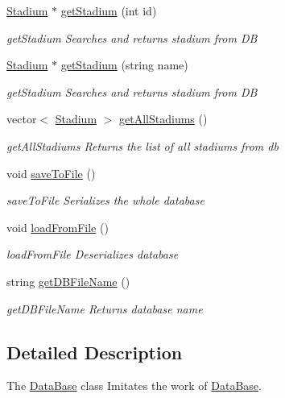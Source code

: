 \begin{DoxyCompactItemize}
\hyperlink{class_stadium}{Stadium} $\ast$ \hyperlink{class_data_base_ac74f70e78835fe65bc511996cdec1271}{get\-Stadium} (int id)
\begin{DoxyCompactList}\small\item\em get\-Stadium Searches and returns stadium from D\-B \end{DoxyCompactList}\item 
\hyperlink{class_stadium}{Stadium} $\ast$ \hyperlink{class_data_base_a6b9befc23eec89afb2358edba78f8d5b}{get\-Stadium} (string name)
\begin{DoxyCompactList}\small\item\em get\-Stadium Searches and returns stadium from D\-B \end{DoxyCompactList}\item 
vector$<$ \hyperlink{class_stadium}{Stadium} $>$ \hyperlink{class_data_base_abbe9017e9a0b50e670e6a34114d34eaa}{get\-All\-Stadiums} ()
\begin{DoxyCompactList}\small\item\em get\-All\-Stadiums Returns the list of all stadiums from db \end{DoxyCompactList}\item 
void \hyperlink{class_data_base_a334b5c4d7bb70a95a1c21e2370c492fa}{save\-To\-File} ()
\begin{DoxyCompactList}\small\item\em save\-To\-File Serializes the whole database \end{DoxyCompactList}\item 
void \hyperlink{class_data_base_aa3daa078a985299d3a9ecbee1bdc9f2d}{load\-From\-File} ()
\begin{DoxyCompactList}\small\item\em load\-From\-File Deserializes database \end{DoxyCompactList}\item 
string \hyperlink{class_data_base_a159f1697e0970519da41ef52051c3194}{get\-D\-B\-File\-Name} ()
\begin{DoxyCompactList}\small\item\em get\-D\-B\-File\-Name Returns database name \end{DoxyCompactList}\end{DoxyCompactItemize}


\subsection{Detailed Description}
The \hyperlink{class_data_base}{Data\-Base} class Imitates the work of \hyperlink{class_data_base}{Data\-Base}. 

